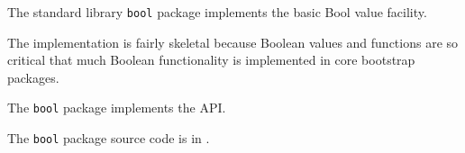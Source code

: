 
The standard library {\tt bool} package implements the basic Bool value facility.

The implementation is fairly skeletal because Boolean values and 
functions are so critical that much Boolean functionality is 
implemented in core bootstrap packages.

The {\tt bool} package implements the  API.

The {\tt bool} package source code is in .



